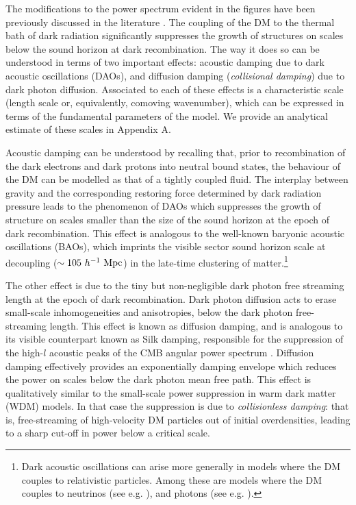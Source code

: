 \documentclass[12pt]{article}
\begin{document}
The modifications to the power spectrum evident in the figures have been previously discussed in the literature \cite{ber1,ignatiev,ber2,cmb2,cyr2,cyn}. 
The coupling of the DM to the thermal bath of dark radiation significantly suppresses the growth of structures on scales below 
the sound horizon at dark recombination. The way it does so can be understood in terms of two important effects: acoustic damping due to 
dark acoustic oscillations (DAOs), and diffusion damping (\textit{collisional damping}) due to dark photon diffusion. Associated to 
each of these effects is a characteristic scale (length scale or, equivalently, comoving wavenumber), which can be expressed in terms of the fundamental
parameters of the model. We provide an analytical estimate of these scales in Appendix A.

Acoustic damping can be understood by recalling that, prior to recombination of the dark electrons and dark protons into 
neutral bound states, the behaviour of the DM can be modelled as that of a tightly coupled fluid. The interplay between gravity and the corresponding 
restoring force determined by dark radiation pressure leads to the phenomenon of DAOs which suppresses the
growth of structure on scales smaller than the size of the sound horizon at the epoch of dark recombination. This effect 
is analogous to the well-known baryonic acoustic oscillations (BAOs), which imprints the visible sector sound horizon 
scale at decoupling ($\sim 105 \ h^{-1} \ \rm Mpc$) in the late-time clustering of matter.\footnote{Dark acoustic oscillations can arise 
more generally in models where the DM couples to relativistic particles. Among these are models where 
the DM couples to neutrinos (see e.g. \cite{shoemaker,escudero}), and photons (see e.g.  \cite{pascoli1,pascoli2}).}

The other effect is due to the tiny but non-negligible dark photon free streaming length at the epoch of dark recombination. 
Dark photon diffusion acts to erase small-scale inhomogeneities and anisotropies, below the dark photon free-streaming length. 
This effect is known as diffusion damping, and is 
analogous to its visible counterpart known as Silk damping, responsible for the suppression of the high-$l$ acoustic peaks of the 
CMB angular power spectrum \cite{silkapj1968}. Diffusion damping effectively provides an exponentially damping envelope which reduces the power on 
scales below the dark photon mean free path. This effect is qualitatively similar to the small-scale power suppression in 
warm dark matter (WDM) models. In that case the suppression is due to \textit{collisionless damping}: that 
is, free-streaming of high-velocity DM particles out of initial overdensities, leading to a sharp cut-off 
in power below a critical scale. 
\end{document}
